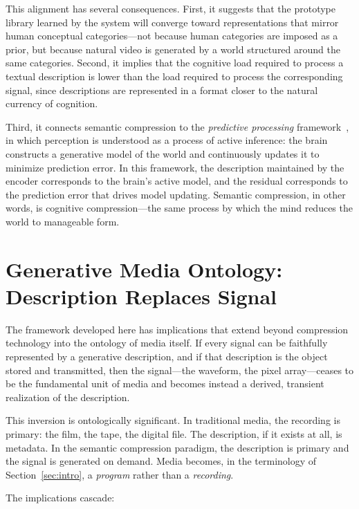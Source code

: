 \documentclass[12pt,a4paper]{article}
\theoremstyle{definition}
\theoremstyle{remark}
\begin{document}
This alignment has several consequences. First, it suggests that the prototype library learned by the system will converge toward representations that mirror human conceptual categories---not because human categories are imposed as a prior, but because natural video is generated by a world structured around the same categories. Second, it implies that the cognitive load required to process a textual description is lower than the load required to process the corresponding signal, since descriptions are represented in a format closer to the natural currency of cognition.

Third, it connects semantic compression to the \emph{predictive processing} framework~\cite{friston}, in which perception is understood as a process of active inference: the brain constructs a generative model of the world and continuously updates it to minimize prediction error. In this framework, the description maintained by the encoder corresponds to the brain's active model, and the residual corresponds to the prediction error that drives model updating. Semantic compression, in other words, is cognitive compression---the same process by which the mind reduces the world to manageable form.

\section{Generative Media Ontology: Description Replaces Signal}
\label{sec:ontology}

The framework developed here has implications that extend beyond compression technology into the ontology of media itself. If every signal can be faithfully represented by a generative description, and if that description is the object stored and transmitted, then the signal---the waveform, the pixel array---ceases to be the fundamental unit of media and becomes instead a derived, transient realization of the description.

This inversion is ontologically significant. In traditional media, the recording is primary: the film, the tape, the digital file. The description, if it exists at all, is metadata. In the semantic compression paradigm, the description is primary and the signal is generated on demand. Media becomes, in the terminology of Section~\ref{sec:intro}, a \emph{program} rather than a \emph{recording}.

The implications cascade:
\end{document}
